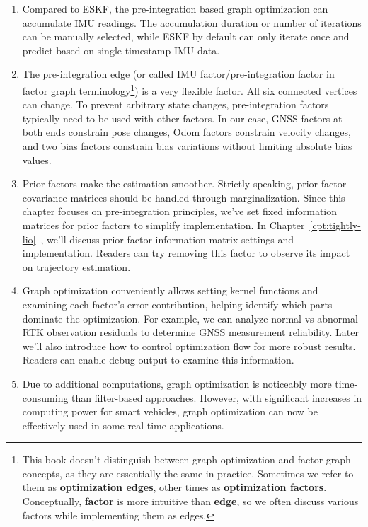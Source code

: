 \begin{enumerate}
	\item Compared to ESKF, the pre-integration based graph optimization can accumulate IMU readings. The accumulation duration or number of iterations can be manually selected, while ESKF by default can only iterate once and predict based on single-timestamp IMU data.
	
	\item The pre-integration edge (or called IMU factor/pre-integration factor in factor graph terminology\footnote{This book doesn't distinguish between graph optimization and factor graph concepts, as they are essentially the same in practice. Sometimes we refer to them as \textbf{optimization edges}, other times as \textbf{optimization factors}. Conceptually, \textbf{factor} is more intuitive than \textbf{edge}, so we often discuss various factors while implementing them as edges.}) is a very flexible factor. All six connected vertices can change. To prevent arbitrary state changes, pre-integration factors typically need to be used with other factors. In our case, GNSS factors at both ends constrain pose changes, Odom factors constrain velocity changes, and two bias factors constrain bias variations without limiting absolute bias values.
	
	\item Prior factors make the estimation smoother. Strictly speaking, prior factor covariance matrices should be handled through marginalization. Since this chapter focuses on pre-integration principles, we've set fixed information matrices for prior factors to simplify implementation. In Chapter~\ref{cpt:tightly-lio}~, we'll discuss prior factor information matrix settings and implementation. Readers can try removing this factor to observe its impact on trajectory estimation.
	
	\item Graph optimization conveniently allows setting kernel functions and examining each factor's error contribution, helping identify which parts dominate the optimization. For example, we can analyze normal vs abnormal RTK observation residuals to determine GNSS measurement reliability. Later we'll also introduce how to control optimization flow for more robust results. Readers can enable debug output to examine this information.
	
	\item Due to additional computations, graph optimization is noticeably more time-consuming than filter-based approaches. However, with significant increases in computing power for smart vehicles, graph optimization can now be effectively used in some real-time applications.
\end{enumerate}

